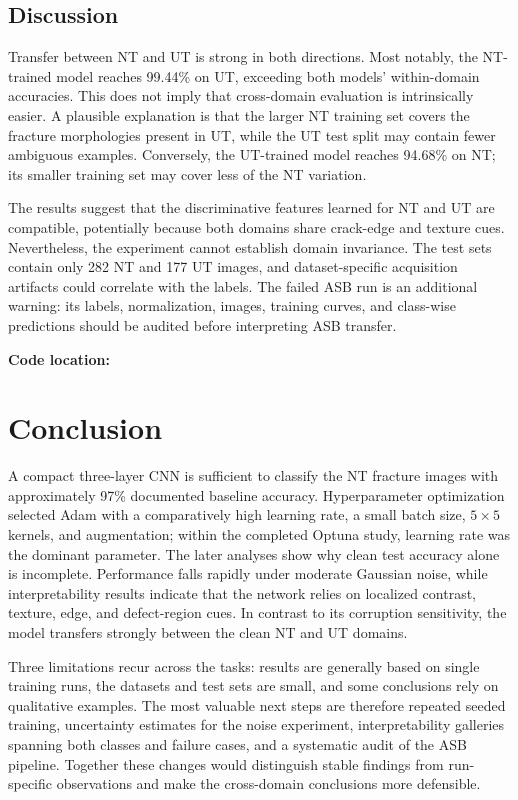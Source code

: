 \documentclass[11pt]{article}
\newcommand{\codelocation}[1]{\par\smallskip\noindent\textbf{Code location:} \path{#1}}
\begin{document}
\subsection{Discussion}

Transfer between NT and UT is strong in both directions. Most notably, the NT-trained model reaches 99.44\% on UT, exceeding both models' within-domain accuracies. This does not imply that cross-domain evaluation is intrinsically easier. A plausible explanation is that the larger NT training set covers the fracture morphologies present in UT, while the UT test split may contain fewer ambiguous examples. Conversely, the UT-trained model reaches 94.68\% on NT; its smaller training set may cover less of the NT variation.

The results suggest that the discriminative features learned for NT and UT are compatible, potentially because both domains share crack-edge and texture cues. Nevertheless, the experiment cannot establish domain invariance. The test sets contain only 282 NT and 177 UT images, and dataset-specific acquisition artifacts could correlate with the labels. The failed ASB run is an additional warning: its labels, normalization, images, training curves, and class-wise predictions should be audited before interpreting ASB transfer.

\codelocation{tasks/task_5_cross_dataset/}

\clearpage
\section{Conclusion}

A compact three-layer CNN is sufficient to classify the NT fracture images with approximately 97\% documented baseline accuracy. Hyperparameter optimization selected Adam with a comparatively high learning rate, a small batch size, $5\times5$ kernels, and augmentation; within the completed Optuna study, learning rate was the dominant parameter. The later analyses show why clean test accuracy alone is incomplete. Performance falls rapidly under moderate Gaussian noise, while interpretability results indicate that the network relies on localized contrast, texture, edge, and defect-region cues. In contrast to its corruption sensitivity, the model transfers strongly between the clean NT and UT domains.

Three limitations recur across the tasks: results are generally based on single training runs, the datasets and test sets are small, and some conclusions rely on qualitative examples. The most valuable next steps are therefore repeated seeded training, uncertainty estimates for the noise experiment, interpretability galleries spanning both classes and failure cases, and a systematic audit of the ASB pipeline. Together these changes would distinguish stable findings from run-specific observations and make the cross-domain conclusions more defensible.
\end{document}

